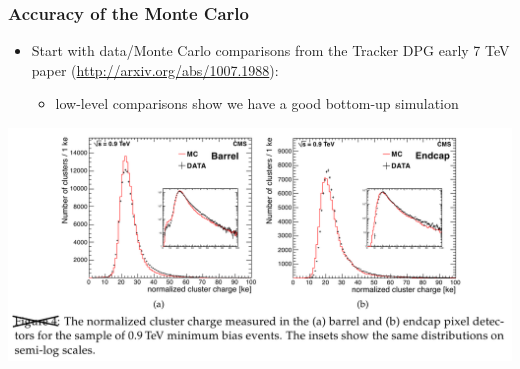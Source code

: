\documentclass[compress]{beamer}
\begin{document}
\begin{frame}
\frametitle{Accuracy of the Monte Carlo}

\begin{itemize}
\item Start with data/Monte Carlo comparisons from the Tracker
  DPG early 7 TeV paper (\textcolor{blue}{\url{http://arxiv.org/abs/1007.1988}}):
\begin{itemize}
\item low-level comparisons show we have a good bottom-up simulation
\end{itemize}
\end{itemize}

\begin{center}
\includegraphics[width=\linewidth]{cluster_charge.png}
\end{center}
\end{frame}
\end{document}
